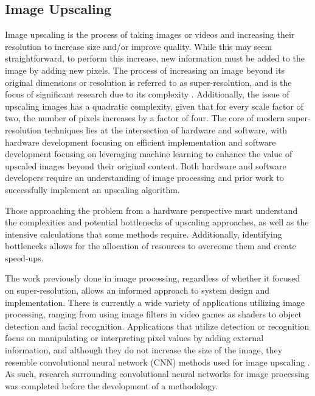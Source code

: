 \documentclass{article}
\begin{document}
    \subsection{Image Upscaling} \noindent Image upscaling is the process of taking images or videos and increasing their resolution to increase size and/or improve quality. While this may seem straightforward, to perform this increase, new information must be added to the image by adding new pixels. The process of increasing an image beyond its original dimensions or resolution is referred to as super-resolution, and is the focus of significant research due to its complexity \cite{van_ouwerkerk_image_2006}. Additionally, the issue of upscaling images has a quadratic complexity, given that for every scale factor of two, the number of pixels increases by a factor of four. The core of modern super-resolution techniques lies at the intersection of hardware and software, with hardware development focusing on efficient implementation and software development focusing on leveraging machine learning to enhance the value of upscaled images beyond their original content. Both hardware and software developers require an understanding of image processing and prior work to successfully implement an upscaling algorithm. 
    \par Those approaching the problem from a hardware perspective must understand the complexities and potential bottlenecks of upscaling approaches, as well as the intensive calculations that some methods require. Additionally, identifying bottlenecks allows for the allocation of resources to overcome them and create speed-ups. 
    \par The work previously done in image processing, regardless of whether it focused on super-resolution, allows an informed approach to system design and implementation. There is currently a wide variety of applications utilizing image processing, ranging from using image filters in video games as shaders to object detection and facial recognition. Applications that utilize detection or recognition focus on manipulating or interpreting pixel values by adding external information, and although they do not increase the size of the image, they resemble convolutional neural network (CNN) methods used for image upscaling \cite{naranjo-torres_review_2020}\cite{li_convolutional_2015}. As such, research surrounding convolutional neural networks for image processing was completed before the development of a methodology. 

    
\end{document}
